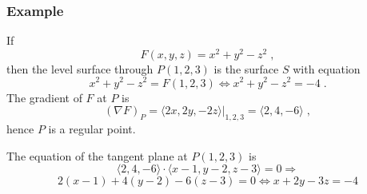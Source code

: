 \begin{frame}
  \frametitle{Example}
  If
  $$F(x,y,z) = x^2 + y^2-z^2 \; ,$$
  then the level surface through $P(1,2,3)$ is the surface $S$ with equation
%
$$x^2+y^2 -z^2 = F(1,2,3) \Longleftrightarrow x^2+y^2 -z^2 = -4 \; .$$
%
\pause The gradient of $F$ at $P$ is \pause
%
$$(\nabla F)_P = \left. \langle 2x, 2y, -2z \rangle \right|_{1,2,3} = \langle 2,4,-6 \rangle \; ,$$
%
\pause hence $P$ is a regular point.

\pause The equation of the tangent plane at $P(1,2,3)$ is\pause
%
$$\langle 2,4,-6 \rangle \cdot \langle x-1, y-2, z-3\rangle = 0 \Longrightarrow$$
%
$$2(x-1) + 4(y-2) -6(z-3) = 0  \Longleftrightarrow x+2y-3z=-4$$
\end{frame}